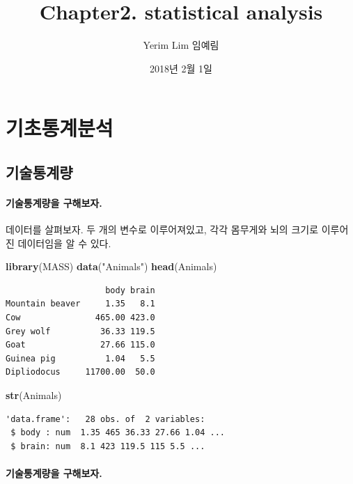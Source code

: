 \documentclass[]{article}
\title{Chapter2. statistical analysis}
\author{Yerim Lim 임예림}
\date{2018년 2월 1일}
\newenvironment{Shaded}{\begin{snugshade}}{\end{snugshade}}
\newcommand{\KeywordTok}[1]{\textcolor[rgb]{0.13,0.29,0.53}{\textbf{#1}}}
\newcommand{\StringTok}[1]{\textcolor[rgb]{0.31,0.60,0.02}{#1}}
\newcommand{\NormalTok}[1]{#1}
\let\oldparagraph\paragraph
\renewcommand{\paragraph}[1]{\oldparagraph{#1}\mbox{}}
\begin{document}
\maketitle

{
\setcounter{tocdepth}{2}
\tableofcontents
}
\section{기초통계분석}

\subsection{기술통계량}

\paragraph{기술통계량을 구해보자.}\label{-.}

데이터를 살펴보자. 두 개의 변수로 이루어져있고, 각각 몸무게와 뇌의
크기로 이루어진 데이터임을 알 수 있다.

\begin{Shaded}
\begin{Highlighting}[]
\KeywordTok{library}\NormalTok{(MASS)}
\KeywordTok{data}\NormalTok{(}\StringTok{"Animals"}\NormalTok{)}
\KeywordTok{head}\NormalTok{(Animals)}
\end{Highlighting}
\end{Shaded}

\begin{verbatim}
                    body brain
Mountain beaver     1.35   8.1
Cow               465.00 423.0
Grey wolf          36.33 119.5
Goat               27.66 115.0
Guinea pig          1.04   5.5
Dipliodocus     11700.00  50.0
\end{verbatim}

\begin{Shaded}
\begin{Highlighting}[]
\KeywordTok{str}\NormalTok{(Animals)}
\end{Highlighting}
\end{Shaded}

\begin{verbatim}
'data.frame':   28 obs. of  2 variables:
 $ body : num  1.35 465 36.33 27.66 1.04 ...
 $ brain: num  8.1 423 119.5 115 5.5 ...
\end{verbatim}

\paragraph{\texorpdfstring{기술통계량을 구해보자.
}{기술통계량을 구해보자.  }}\label{-.-1}
\end{document}
